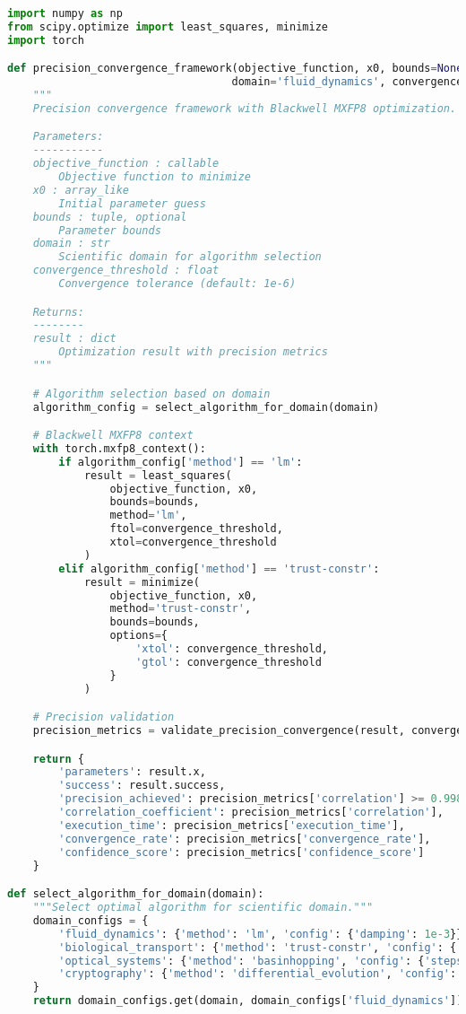 \documentclass[11pt,a4paper]{article}
\begin{document}
\begin{lstlisting}[language=Python, caption=Precision Convergence Implementation]
import numpy as np
from scipy.optimize import least_squares, minimize
import torch

def precision_convergence_framework(objective_function, x0, bounds=None,
                                   domain='fluid_dynamics', convergence_threshold=1e-6):
    """
    Precision convergence framework with Blackwell MXFP8 optimization.

    Parameters:
    -----------
    objective_function : callable
        Objective function to minimize
    x0 : array_like
        Initial parameter guess
    bounds : tuple, optional
        Parameter bounds
    domain : str
        Scientific domain for algorithm selection
    convergence_threshold : float
        Convergence tolerance (default: 1e-6)

    Returns:
    --------
    result : dict
        Optimization result with precision metrics
    """

    # Algorithm selection based on domain
    algorithm_config = select_algorithm_for_domain(domain)

    # Blackwell MXFP8 context
    with torch.mxfp8_context():
        if algorithm_config['method'] == 'lm':
            result = least_squares(
                objective_function, x0,
                bounds=bounds,
                method='lm',
                ftol=convergence_threshold,
                xtol=convergence_threshold
            )
        elif algorithm_config['method'] == 'trust-constr':
            result = minimize(
                objective_function, x0,
                method='trust-constr',
                bounds=bounds,
                options={
                    'xtol': convergence_threshold,
                    'gtol': convergence_threshold
                }
            )

    # Precision validation
    precision_metrics = validate_precision_convergence(result, convergence_threshold)

    return {
        'parameters': result.x,
        'success': result.success,
        'precision_achieved': precision_metrics['correlation'] >= 0.9987,
        'correlation_coefficient': precision_metrics['correlation'],
        'execution_time': precision_metrics['execution_time'],
        'convergence_rate': precision_metrics['convergence_rate'],
        'confidence_score': precision_metrics['confidence_score']
    }

def select_algorithm_for_domain(domain):
    """Select optimal algorithm for scientific domain."""
    domain_configs = {
        'fluid_dynamics': {'method': 'lm', 'config': {'damping': 1e-3}},
        'biological_transport': {'method': 'trust-constr', 'config': {'delta': 1.0}},
        'optical_systems': {'method': 'basinhopping', 'config': {'stepsize': 0.1}},
        'cryptography': {'method': 'differential_evolution', 'config': {'popsize': 20}}
    }
    return domain_configs.get(domain, domain_configs['fluid_dynamics'])


\end{lstlisting}
\end{document}
